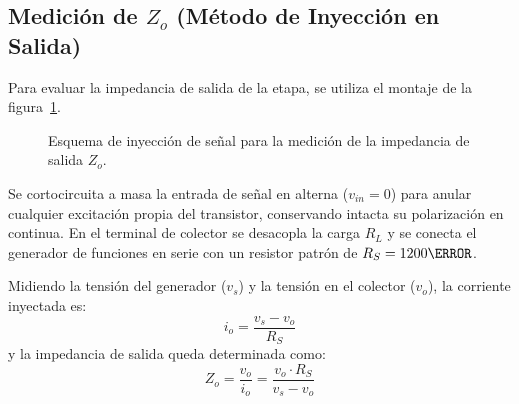 \subsection{Medición de \texorpdfstring{$Z_o$}{Zo} (Método de Inyección en Salida)}
Para evaluar la impedancia de salida de la etapa, se utiliza el montaje de la figura~\ref{crkt:medicion_zo}.

\begin{figure}[!ht]
  \centering
  
  \caption{Esquema de inyección de señal para la medición de la impedancia de salida $Z_o$.}
  \label{crkt:medicion_zo}
\end{figure}

Se cortocircuita a masa la entrada de señal en alterna ($v_{in} = 0$) para anular cualquier excitación propia del
transistor, conservando intacta su polarización en continua. En el terminal de colector se desacopla la carga $R_L$ y se
conecta el generador de funciones en serie con un resistor patrón de $R_S = 1200\ohm$.

Midiendo la tensión del generador ($v_s$) y la tensión en el colector ($v_o$), la corriente inyectada es:
\begin{equation}
  i_o = \frac{v_s - v_o}{R_S}
\end{equation}
y la impedancia de salida queda determinada como:
\begin{equation}
  Z_o = \frac{v_o}{i_o} = \frac{v_o \cdot R_S}{v_s - v_o}
  \label{eq:Zo_exp_formula}
\end{equation}
